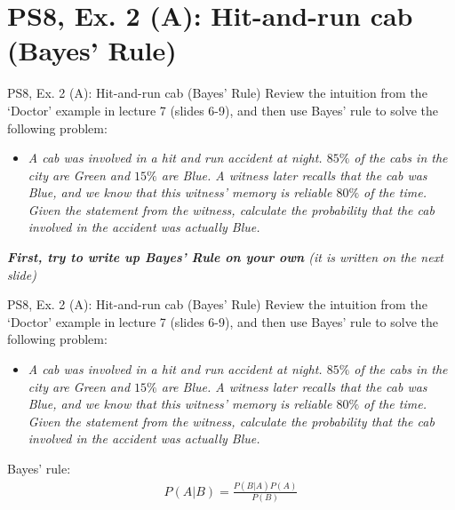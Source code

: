 \section{PS8, Ex. 2 (A): Hit-and-run cab (Bayes' Rule)}

\begin{frame}{PS8, Ex. 2 (A): Hit-and-run cab (Bayes' Rule)}
    \vspace{-10pt}
    Review the intuition from the ‘Doctor’ example in lecture 7 (slides 6-9), and then use Bayes’ rule to solve the following problem:
    \begin{itemize}
        \item[] \textit{A cab was involved in a hit and run accident at night. $85\%$ of the cabs in the city are Green and $15\%$ are Blue. A witness later recalls that the cab was Blue, and we know that this witness’ memory is reliable $80\%$ of the time. Given the statement from the witness, calculate the probability that the cab involved in the accident was actually Blue.}
    \end{itemize}
    \textit{\textbf{First, try to write up Bayes' Rule on your own} (it is written on the next slide)}
    \vfill\null
\end{frame}
\begin{frame}{PS8, Ex. 2 (A): Hit-and-run cab (Bayes' Rule)}
    \vspace{-10pt}
    Review the intuition from the ‘Doctor’ example in lecture 7 (slides 6-9), and then use Bayes’ rule to solve the following problem:
    \begin{itemize}
        \item[] \textit{A cab was involved in a hit and run accident at night. $85\%$ of the cabs in the city are Green and $15\%$ are Blue. A witness later recalls that the cab was Blue, and we know that this witness’ memory is reliable $80\%$ of the time. Given the statement from the witness, calculate the probability that the cab involved in the accident was actually Blue.}
    \end{itemize}
    Bayes' rule:
    \begin{align*}
        P(A|B)=\frac{P(B|A)P(A)}{P(B)}
    \end{align*}
    \vfill\null
\end{frame}

